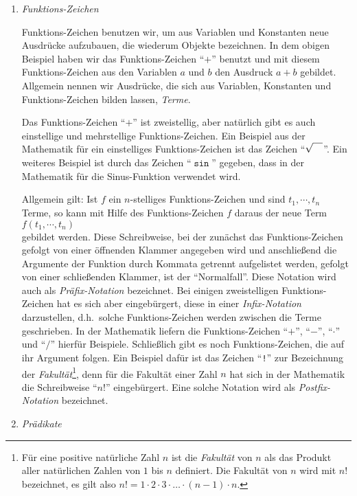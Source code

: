 \begin{enumerate}
\item \emph{Funktions-Zeichen}

      Funktions-Zeichen benutzen wir, um aus Variablen und Konstanten neue Ausdrücke aufzubauen,
      die wiederum Objekte bezeichnen.  In dem obigen Beispiel haben wir das Funktions-Zeichen
      ``$+$'' benutzt und mit diesem Funktions-Zeichen aus den Variablen $a$ und $b$ den Ausdruck $a+b$
      gebildet.  Allgemein nennen wir Ausdrücke, die sich aus Variablen, Konstanten und Funktions-Zeichen 
      bilden lassen, \emph{Terme}.  

      Das Funktions-Zeichen ``$+$'' ist zweistellig, aber natürlich gibt es auch einstellige und
      mehrstellige Funktions-Zeichen. Ein Beispiel aus der Mathematik für ein einstelliges Funktions-Zeichen ist 
      das Zeichen ``$\sqrt{\rule{0pt}{9pt}\quad}$''.  Ein weiteres Beispiel
      ist durch das Zeichen ``$\mathtt{\sin}$'' gegeben, dass in der Mathematik für die
      Sinus-Funktion verwendet wird.

      Allgemein gilt: Ist $f$ ein $n$-stelliges Funktions-Zeichen und sind 
       $t_1, \cdots, t_n$ Terme,
      so kann mit Hilfe des Funktions-Zeichen $f$  daraus der neue Term \\[0.2cm]
      \hspace*{1.3cm} $f(t_1,\cdots,t_n)$ \\[0.2cm]
      gebildet werden.  Diese Schreibweise, bei der zunächst das Funktions-Zeichen
      gefolgt von einer öffnenden Klammer angegeben wird und anschließend die Argumente
      der Funktion durch Kommata getrennt aufgelistet werden, gefolgt von einer
      schließenden Klammer, ist der ``Normalfall''.  Diese Notation wird auch als \emph{Präfix-Notation}
      bezeichnet. Bei einigen zweistelligen Funktions-Zeichen hat es sich aber eingebürgert, diese in einer
      \emph{Infix-Notation} darzustellen, d.h.~solche Funktions-Zeichen werden zwischen
      die Terme geschrieben. In der Mathematik liefern die  Funktions-Zeichen ``$+$'',
      ``$-$'', ``$\cdot $'' und ``$/$'' hierfür Beispiele.  Schließlich gibt es noch Funktions-Zeichen,
      die auf ihr Argument folgen.  Ein Beispiel dafür ist das Zeichen ``\texttt{!}'' zur
      Bezeichnung der \emph{Fakultät}\footnote{
      Für eine positive natürliche Zahl $n$ ist die \emph{Fakultät} von $n$ als das Produkt aller
      natürlichen Zahlen von $1$ bis $n$ definiert.  Die Fakultät von $n$ wird mit $n!$ bezeichnet, 
      es gilt also $n! = 1 \cdot 2 \cdot 3 \cdot \dots \cdot (n-1) \cdot n$.},
      denn für die Fakultät einer Zahl $n$ hat sich in der Mathematik
      die Schreibweise ``$n!$'' eingebürgert.  Eine solche Notation wird als \emph{Postfix-Notation}
      bezeichnet.
\item \emph{Prädikate}


\end{enumerate}
